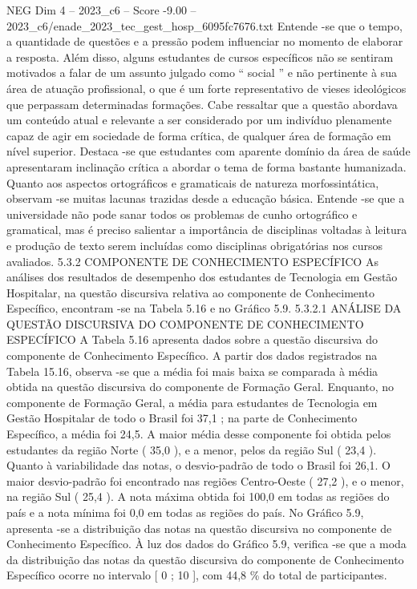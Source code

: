 \begin{textsample}{NEG Dim 4 – 2023\_c6 – Score -9.00 – 2023\_c6/enade\_2023\_tec\_gest\_hosp\_6095fc7676.txt}
Entende -se que o tempo, a quantidade de questões e a pressão podem influenciar no momento de elaborar a resposta.
Além disso, alguns estudantes de cursos específicos não se sentiram motivados a falar de um assunto julgado como “ social ” e não pertinente à sua área de atuação profissional, o que é um forte representativo de vieses ideológicos que perpassam determinadas formações.
Cabe ressaltar que a questão abordava um conteúdo atual e relevante a ser considerado por um indivíduo plenamente capaz de agir em sociedade de forma crítica, de qualquer área de formação em nível superior.
Destaca -se que estudantes com aparente domínio da área de saúde apresentaram inclinação crítica a abordar o tema de forma bastante humanizada.
Quanto aos aspectos ortográficos e gramaticais de natureza morfossintática, observam -se muitas lacunas trazidas desde a educação básica.
Entende -se que a universidade não pode sanar todos os problemas de cunho ortográfico e gramatical, mas é preciso salientar a importância de disciplinas voltadas à leitura e produção de texto serem incluídas como disciplinas obrigatórias nos cursos avaliados. 5.3.2 COMPONENTE DE CONHECIMENTO ESPECÍFICO As análises dos resultados de desempenho dos estudantes de Tecnologia em Gestão Hospitalar, na questão discursiva relativa ao componente de Conhecimento Específico, encontram -se na Tabela 5.16 e no Gráfico 5.9. 5.3.2.1 ANÁLISE DA QUESTÃO DISCURSIVA DO COMPONENTE DE CONHECIMENTO ESPECÍFICO A Tabela 5.16 apresenta dados sobre a questão discursiva do componente de Conhecimento Específico.
A partir dos dados registrados na Tabela 15.16, observa -se que a média foi mais baixa se comparada à média obtida na questão discursiva do componente de Formação Geral.
Enquanto, no componente de Formação Geral, a média para estudantes de Tecnologia em Gestão Hospitalar de todo o Brasil foi 37,1 ; na parte de Conhecimento Específico, a média foi 24,5.
A maior média desse componente foi obtida pelos estudantes da região Norte ( 35,0 ), e a menor, pelos da região Sul ( 23,4 ).
Quanto à variabilidade das notas, o desvio-padrão de todo o Brasil foi 26,1.
O maior desvio-padrão foi encontrado nas regiões Centro-Oeste ( 27,2 ), e o menor, na região Sul ( 25,4 ).
A nota máxima obtida foi 100,0 em todas as regiões do país e a nota mínima foi 0,0 em todas as regiões do país.
No Gráfico 5.9, apresenta -se a distribuição das notas na questão discursiva no componente de Conhecimento Específico.
À luz dos dados do Gráfico 5.9, verifica -se que a moda da distribuição das notas da questão discursiva do componente de Conhecimento Específico ocorre no intervalo [ 0 ; 10 ], com 44,8 \% do total de participantes.

\end{textsample}
